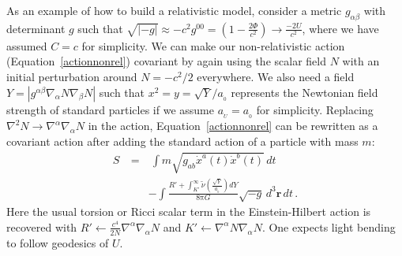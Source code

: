\documentclass[fleqn,usenatbib,useAMS,onecolumn]{mnras} %
\begin{document}
As an example of how to build a relativistic model, consider a metric $g_{\alpha\beta}$ with determinant $g$ such that $\sqrt{\left| -g \right|} \approx -c^2 g^{00} = \left( 1 - \frac{2\Phi}{c^2} \right) \rightarrow \frac{-2U}{c^2}$, where we have assumed $C=c$ for simplicity. We can make our non-relativistic action (Equation~\ref{actionnonrel}) covariant by again using the scalar field $N$ with an initial perturbation around $N = -c^2/2$ everywhere. We also need a field $Y = \left| g^{\alpha\beta}\nabla_\alpha N \nabla_\beta N \right|$ such that $x^2 = y = \sqrt{Y}/a_{_0}$ represents the Newtonian field strength of standard particles if we assume $a_{_U} = a_{_0}$ for simplicity. Replacing $\nabla^2 N \rightarrow \nabla^\alpha \nabla_\alpha N$ in the action, Equation~\ref{actionnonrel} can be rewritten as a covariant action after adding the standard action of a particle with mass $m$:
\begin{eqnarray}
	S ~&=&~ \int  m\sqrt{g_{ab} \dot{x}^a(t) \dot{x}^b(t)} \, dt \nonumber \\
	&&-\int \frac{R' + \int^\infty_{K'} \widetilde{\nu}\left(\frac{\sqrt{Y}}{{a_{_0}}}\right)   dY}{8 \mathrm{\pi} G} \sqrt{-g} \, d^3 \bm{r} \, dt \, .
	\label{covLag}
\end{eqnarray}
Here the usual torsion or Ricci scalar term in the Einstein-Hilbert action is recovered with $R' \leftarrow \frac{c^4}{2N} \nabla^\alpha \nabla_\alpha N$ and $K' \leftarrow \nabla^\alpha N \nabla_\alpha N$.  One expects light bending to follow geodesics of $U$.

%
\end{document}
